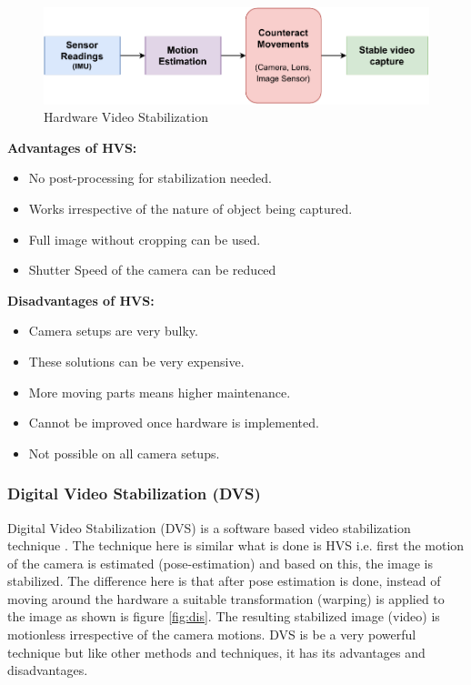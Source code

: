 \begin{figure}[H]
\centering
\includegraphics[scale=0.8]{images/fig_chapter2/2_1_his.pdf}
\caption{Hardware Video Stabilization}
\label{fig:his}
\end{figure}

\textbf{Advantages of HVS: }

\begin{itemize}
\item No post-processing for stabilization needed.
\item Works irrespective of the nature of object being captured.
\item Full image without cropping can be used.
\item Shutter Speed of the camera can be reduced
\end{itemize}

\textbf{Disadvantages of HVS:}
\begin{itemize}
\item Camera setups are very bulky.
\item These solutions can be very expensive.
\item More moving parts means higher maintenance.
\item Cannot be improved once hardware is implemented.
\item Not possible on all camera setups.
\end{itemize}

\subsubsection{Digital Video Stabilization (DVS)}
Digital Video Stabilization (DVS) is a software based video stabilization technique \citep{dis_review}. The technique here is similar what is done is HVS i.e. first the motion of the camera is estimated (pose-estimation) and based on this, the image is stabilized. The difference here is that after pose estimation is done, instead of moving around the hardware a suitable transformation (warping) is applied to the image \citep{dis_feat_track} as shown is figure \ref{fig:dis}. The resulting stabilized image (video) is motionless irrespective of the camera motions. DVS is be a very powerful technique but like other methods and techniques, it has its advantages and disadvantages.

